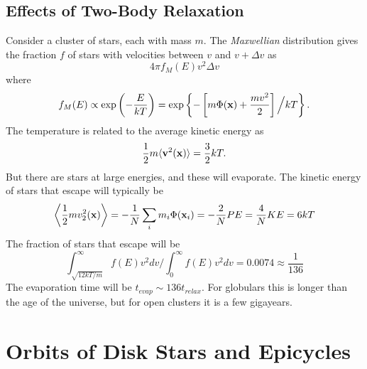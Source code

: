 \documentclass[]{article}
\begin{document}
\subsection{Effects of Two-Body Relaxation}

Consider a cluster of stars, each with mass $m$.
The {\it Maxwellian} distribution gives the fraction $f$ of stars with 
velocities between $v$ and $v+\Delta v$ as
\begin{equation}
4\pi f_M(E) v^{2} \Delta v 
\end{equation}
\noindent
where
\begin{equation}
f_M(E)\propto \exp\left(-\frac{E}{kT} \right) = \exp \left\{ -\left[ m\Phi(\mathbf{x}) + \frac{mv^{2}}{2} \right]
 \Big/ kT \right\}.
\end{equation}
The temperature is related to the average kinetic energy as
\begin{equation}
\frac{1}{2}m\langle\mathbf{v}^{2}(\mathbf{x})\rangle = \frac{3}{2}kT.
\end{equation}
\noindent
But there are stars at large energies, and these will evaporate. The kinetic
energy of stars that escape will typically be
\begin{equation}
\left\langle \frac{1}{2} m v_2^2(\mathbf{x}) \right\rangle = - \frac{1}{N} \sum_i m_i \Phi(\mathbf{x}_i) = -\frac{2}{N} PE = \frac{4}{N} KE = 6 kT
\end{equation}
The fraction of stars that escape will be
\begin{equation}
\int_{\sqrt{12kT/m}}^{\infty} f(E) v^2 dv \Big/ \int_0^{\infty} f(E) v^2 dv = 0.0074 \approx \frac{1}{136}
\end{equation}
\noindent
The evaporation time will be $t_{evap} \sim 136 t_{relax}$.  For globulars this is longer than
the age of the universe, but for open clusters it is a few gigayears.

\section{Orbits of Disk Stars and Epicycles}
\end{document}
